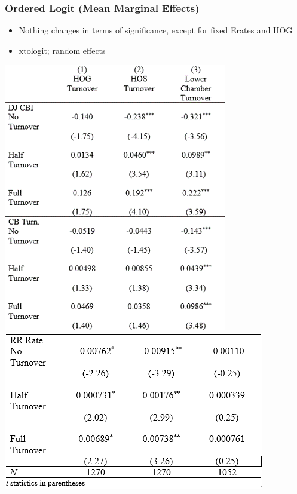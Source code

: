 \documentclass[]{beamer}
\begin{document}
\begin{frame}
    \frametitle{Ordered Logit (Mean Marginal Effects)}
    \begin{itemize}
        \item Nothing changes in terms of significance, except for fixed Erates and HOG
        \item xtologit; random effects
    \end{itemize}
    \includegraphics{img0003.png}
    \includegraphics{img0004.png}
\end{frame}
\end{document}
